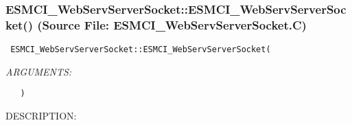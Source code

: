  
\setlength{\oldparskip}{\parskip}
\setlength{\parskip}{1.5ex}
\setlength{\oldparindent}{\parindent}
\setlength{\parindent}{0pt}
\setlength{\oldbaselineskip}{\baselineskip}
\setlength{\baselineskip}{11pt}
 
\def\bv{\begin{verbatim}}
\def\ev{\end{verbatim}}
\def\be{\begin{equation}}
\def\ee{\end{equation}}
\def\bea{\begin{eqnarray}}
\def\eea{\end{eqnarray}}
\def\bi{\begin{itemize}}
\def\ei{\end{itemize}}
\def\bn{\begin{enumerate}}
\def\en{\end{enumerate}}
\def\bd{\begin{description}}
\def\ed{\end{description}}
\def\({\left (}
\def\){\right )}
\def\[{\left [}
\def\]{\right ]}
\def\<{\left  \langle}
\def\>{\right \rangle}
\def\cI{{\cal I}}
\def\diag{\mathop{\rm diag}}
\def\tr{\mathop{\rm tr}}


 
\subsubsection{ESMCI\_WebServServerSocket::ESMCI\_WebServServerSocket() (Source File: ESMCI\_WebServServerSocket.C)}


  
\begin{verbatim} ESMCI_WebServServerSocket::ESMCI_WebServServerSocket(\end{verbatim}{\em ARGUMENTS:}
\begin{verbatim}   )\end{verbatim}
{\sf DESCRIPTION:\\ }


